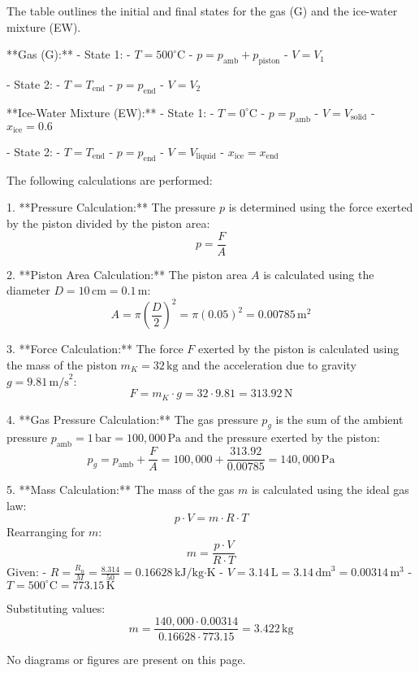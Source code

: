 The table outlines the initial and final states for the gas (G) and the ice-water mixture (EW).  

**Gas (G):**  
- State 1:  
  - \( T = 500^\circ\text{C} \)  
  - \( p = p_{\text{amb}} + p_{\text{piston}} \)  
  - \( V = V_1 \)  

- State 2:  
  - \( T = T_{\text{end}} \)  
  - \( p = p_{\text{end}} \)  
  - \( V = V_2 \)  

**Ice-Water Mixture (EW):**  
- State 1:  
  - \( T = 0^\circ\text{C} \)  
  - \( p = p_{\text{amb}} \)  
  - \( V = V_{\text{solid}} \)  
  - \( x_{\text{ice}} = 0.6 \)  

- State 2:  
  - \( T = T_{\text{end}} \)  
  - \( p = p_{\text{end}} \)  
  - \( V = V_{\text{liquid}} \)  
  - \( x_{\text{ice}} = x_{\text{end}} \)  

The following calculations are performed:  

1. **Pressure Calculation:**  
   The pressure \( p \) is determined using the force exerted by the piston divided by the piston area:  
   \[
   p = \frac{F}{A}
   \]  

2. **Piston Area Calculation:**  
   The piston area \( A \) is calculated using the diameter \( D = 10 \, \text{cm} = 0.1 \, \text{m} \):  
   \[
   A = \pi \left(\frac{D}{2}\right)^2 = \pi \left(0.05\right)^2 = 0.00785 \, \text{m}^2
   \]  

3. **Force Calculation:**  
   The force \( F \) exerted by the piston is calculated using the mass of the piston \( m_K = 32 \, \text{kg} \) and the acceleration due to gravity \( g = 9.81 \, \text{m/s}^2 \):  
   \[
   F = m_K \cdot g = 32 \cdot 9.81 = 313.92 \, \text{N}
   \]  

4. **Gas Pressure Calculation:**  
   The gas pressure \( p_g \) is the sum of the ambient pressure \( p_{\text{amb}} = 1 \, \text{bar} = 100,000 \, \text{Pa} \) and the pressure exerted by the piston:  
   \[
   p_g = p_{\text{amb}} + \frac{F}{A} = 100,000 + \frac{313.92}{0.00785} = 140,000 \, \text{Pa}
   \]  

5. **Mass Calculation:**  
   The mass of the gas \( m \) is calculated using the ideal gas law:  
   \[
   p \cdot V = m \cdot R \cdot T
   \]  
   Rearranging for \( m \):  
   \[
   m = \frac{p \cdot V}{R \cdot T}
   \]  
   Given:  
   - \( R = \frac{R_u}{M} = \frac{8.314}{50} = 0.16628 \, \text{kJ/kg·K} \)  
   - \( V = 3.14 \, \text{L} = 3.14 \, \text{dm}^3 = 0.00314 \, \text{m}^3 \)  
   - \( T = 500^\circ\text{C} = 773.15 \, \text{K} \)  

   Substituting values:  
   \[
   m = \frac{140,000 \cdot 0.00314}{0.16628 \cdot 773.15} = 3.422 \, \text{kg}
   \]  

No diagrams or figures are present on this page.